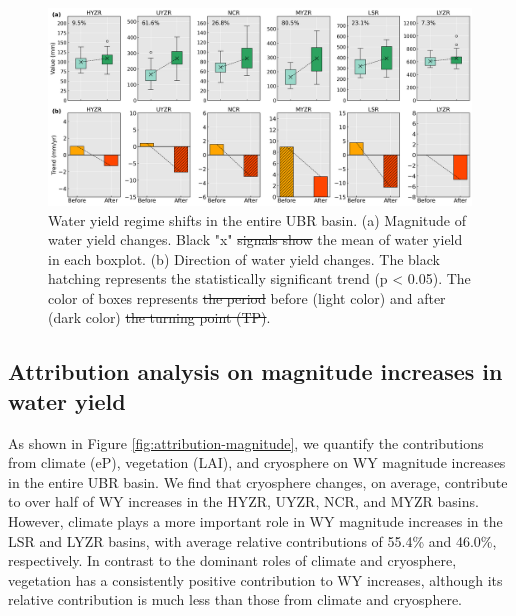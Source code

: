 \documentclass[hess, manuscript]{copernicus}
\providecommand{\DIFaddtex}[1]{{\protect\color{blue}\uwave{#1}}} %
\providecommand{\DIFdeltex}[1]{{\protect\color{red}\sout{#1}}}                      %
\providecommand{\DIFaddFL}[1]{\DIFadd{#1}} %
\providecommand{\DIFdelFL}[1]{\DIFdel{#1}} %
\providecommand{\DIFaddbeginFL}{} %
\providecommand{\DIFaddendFL}{} %
\providecommand{\DIFdelbeginFL}{} %
\providecommand{\DIFdelendFL}{} %
\providecommand{\DIFadd}[1]{\texorpdfstring{\DIFaddtex{#1}}{#1}} %
\providecommand{\DIFdel}[1]{\texorpdfstring{\DIFdeltex{#1}}{}} %
\begin{document}
\begin{figure}[ht]
    \DIFdelbeginFL %
\DIFdelendFL \DIFaddbeginFL \includegraphics[width=\textwidth]{02-figures/magnitude_and_direction.png}
    \DIFaddendFL \caption
    {Water yield regime shifts in the entire UBR basin. (a) Magnitude of water yield changes. Black "x" \DIFdelbeginFL \DIFdelFL{signals show }\DIFdelendFL \DIFaddbeginFL \DIFaddFL{signal shows }\DIFaddendFL the mean of water yield in each boxplot. (b) Direction of water yield changes. The black hatching represents the statistically significant trend (p < 0.05). The color of boxes represents \DIFdelbeginFL \DIFdelFL{the period }\DIFdelendFL before (light color) and after (dark color) \DIFdelbeginFL \DIFdelFL{the turning point (TP)}\DIFdelendFL \DIFaddbeginFL \DIFaddFL{Tp period}\DIFaddendFL .}
    \label{fig:magnitude-direction}
\end{figure}

\subsection{Attribution analysis on magnitude increases in water yield}
As shown in Figure \ref{fig:attribution-magnitude}, we quantify the contributions from climate (eP), vegetation (LAI), and cryosphere on WY magnitude increases in the entire UBR basin. We find that cryosphere changes, on average, contribute to over half of WY increases in the HYZR, UYZR, NCR, and MYZR basins. However, climate plays a more important role in WY magnitude increases in the LSR and LYZR basins, with average relative contributions of 55.4\% and 46.0\%, respectively. In contrast to the dominant roles of climate and cryosphere, vegetation has a consistently positive contribution to WY increases, although its relative contribution is much less than those from climate and cryosphere.
\end{document}
